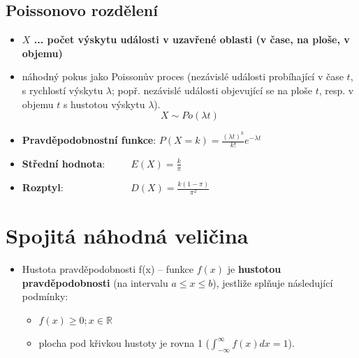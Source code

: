 \subsection{Poissonovo rozdělení}
\begin{itemize}
    \item \textbf{$X$ ... počet výskytu události v uzavřené oblasti (v čase, na ploše, v objemu)}
    \item náhodný pokus jako Poissonův proces (nezávislé události probíhající v čase $t$, s rychlostí výskytu $\lambda$; popř. nezávislé události objevující se na ploše $t$, resp. v objemu $t$ s hustotou výskytu $\lambda$).
          $$X \sim Po(\lambda t)$$
    \item \textbf{Pravděpodobnostní funkce}: $P(X = k) = \frac{(\lambda t)^k}{k!}e^{-\lambda t}$
    \item \textbf{Střední hodnota}: $\qquad$ $E(X) = \frac{k}{\pi}$
    \item \textbf{Rozptyl}: $\qquad\qquad\qquad\;\; D(X) = \frac{k(1- \pi)}{\pi^2}$
\end{itemize}


\section{Spojitá náhodná veličina}
\begin{itemize}
    \item Hustota pravděpodobnosti f(x) -- funkce $f(x)$ je \textbf{hustotou pravděpodobnosti} (na intervalu $a \leq x \leq b$), jestliže splňuje následující podmínky:
          \begin{itemize}
              \item $f(x) \geq 0; x \in \mathbb{R}$
              \item plocha pod křivkou hustoty je rovna 1 ($\int_{-\infty}^{\infty} f(x)dx = 1$).
          \end{itemize}
\end{itemize}

